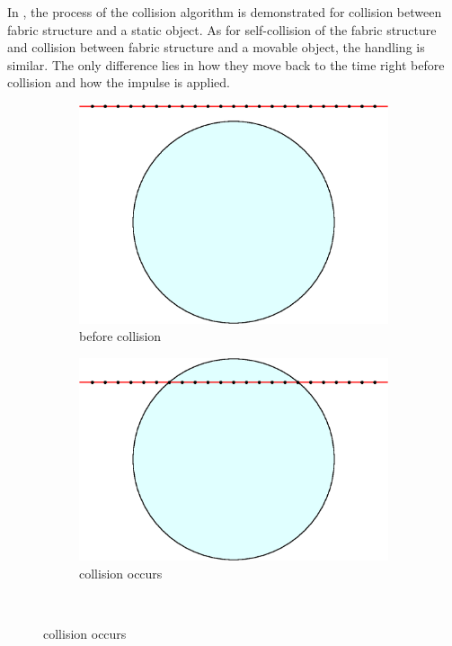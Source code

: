 In , the process of the collision algorithm is 
demonstrated for collision between fabric structure and a static object. 
As for self-collision of the fabric structure and collision between fabric 
structure and a movable object, the handling is similar. 
The only difference lies in how they move back to the time right before 
collision and how the impulse is applied.
\begin{figure}[!ht]
    \centering
    \begin{subfigure}{0.48\columnwidth}
	\includegraphics[width=\textwidth]{figures/collsn_demo_0}
	\caption{before collision}
    \end{subfigure}
    \begin{subfigure}{0.48\columnwidth}
	\includegraphics[width=\textwidth]{figures/collsn_demo_1}
	\caption{collision occurs}
    \end{subfigure} \\

\end{figure}
